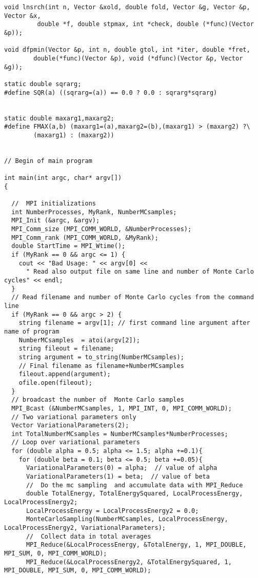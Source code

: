 \begin{verbatim}
void lnsrch(int n, Vector &xold, double fold, Vector &g, Vector &p, Vector &x,
		 double *f, double stpmax, int *check, double (*func)(Vector &p));

void dfpmin(Vector &p, int n, double gtol, int *iter, double *fret,
	    double(*func)(Vector &p), void (*dfunc)(Vector &p, Vector &g));

static double sqrarg;
#define SQR(a) ((sqrarg=(a)) == 0.0 ? 0.0 : sqrarg*sqrarg)


static double maxarg1,maxarg2;
#define FMAX(a,b) (maxarg1=(a),maxarg2=(b),(maxarg1) > (maxarg2) ?\
        (maxarg1) : (maxarg2))


// Begin of main program   

int main(int argc, char* argv[])
{

  //  MPI initializations
  int NumberProcesses, MyRank, NumberMCsamples;
  MPI_Init (&argc, &argv);
  MPI_Comm_size (MPI_COMM_WORLD, &NumberProcesses);
  MPI_Comm_rank (MPI_COMM_WORLD, &MyRank);
  double StartTime = MPI_Wtime();
  if (MyRank == 0 && argc <= 1) {
    cout << "Bad Usage: " << argv[0] << 
      " Read also output file on same line and number of Monte Carlo cycles" << endl;
  }
  // Read filename and number of Monte Carlo cycles from the command line
  if (MyRank == 0 && argc > 2) {
    string filename = argv[1]; // first command line argument after name of program
    NumberMCsamples  = atoi(argv[2]);
    string fileout = filename;
    string argument = to_string(NumberMCsamples);
    // Final filename as filename+NumberMCsamples
    fileout.append(argument);
    ofile.open(fileout);
  }
  // broadcast the number of  Monte Carlo samples
  MPI_Bcast (&NumberMCsamples, 1, MPI_INT, 0, MPI_COMM_WORLD);
  // Two variational parameters only
  Vector VariationalParameters(2);
  int TotalNumberMCsamples = NumberMCsamples*NumberProcesses; 
  // Loop over variational parameters
  for (double alpha = 0.5; alpha <= 1.5; alpha +=0.1){
    for (double beta = 0.1; beta <= 0.5; beta +=0.05){
      VariationalParameters(0) = alpha;  // value of alpha
      VariationalParameters(1) = beta;  // value of beta
      //  Do the mc sampling  and accumulate data with MPI_Reduce
      double TotalEnergy, TotalEnergySquared, LocalProcessEnergy, LocalProcessEnergy2;
      LocalProcessEnergy = LocalProcessEnergy2 = 0.0;
      MonteCarloSampling(NumberMCsamples, LocalProcessEnergy, LocalProcessEnergy2, VariationalParameters);
      //  Collect data in total averages
      MPI_Reduce(&LocalProcessEnergy, &TotalEnergy, 1, MPI_DOUBLE, MPI_SUM, 0, MPI_COMM_WORLD);
      MPI_Reduce(&LocalProcessEnergy2, &TotalEnergySquared, 1, MPI_DOUBLE, MPI_SUM, 0, MPI_COMM_WORLD);

\end{verbatim}
